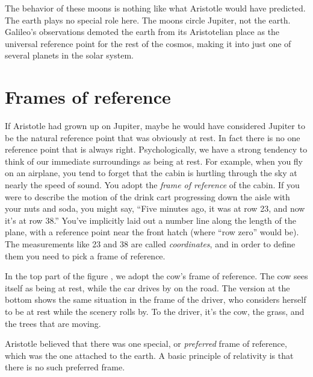 The behavior of these moons is nothing like what Aristotle would have predicted. The earth
plays no special role here. The moons circle Jupiter, not the earth. Galileo's observations demoted
the earth from its Aristotelian place as the universal reference point for the rest of the cosmos,
making it into just one of several planets in the solar system.

\begin{figure}\label{fig:galileo-jovian-moons-sketch}
\end{figure}

\vfill\pagebreak

\section{Frames of reference}

If Aristotle had grown up on Jupiter, maybe he would have considered Jupiter to be the natural reference
point that was obviously at rest. In fact there is no one reference point that is always right. Psychologically,
we have a strong tendency to think of our immediate surroundings as being at rest. For example, when you fly
on an airplane, you tend to forget that the cabin is hurtling through the sky at nearly the speed of sound.
You adopt the \emph{frame of reference} of the cabin.
If you were to describe the motion of the drink cart progressing down the aisle with your nuts and soda,
you might say, ``Five minutes ago, it was at row 23, and now it's at row 38.'' You've implicitly laid out
a number line along the length of the plane, with a reference point near the front hatch (where ``row zero'' would be).
The measurements like 23 and 38 are called \emph{coordinates}, and in order to define them you need to pick
a frame of reference.

\begin{figure}\label{fig:cow-and-car}
\end{figure}

In the top part of the figure , we adopt the cow's frame of reference. The cow sees itself as being at rest,
while the car drives by on the road. The version at the bottom shows the same situation in
the frame of the driver,
who considers herself to be at rest while the scenery rolls by. To the driver, it's the cow, the grass, and
the trees that are moving.

Aristotle believed that there was one special, or \emph{preferred} frame of reference, which was
the one attached to the earth. A basic principle of relativity is that there is no such
preferred frame.

